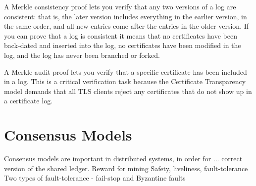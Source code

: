 
A Merkle consistency proof lets you verify that any two versions of a log are consistent: that is, the later version includes everything in the earlier version, in the same order, and all new entries come after the entries in the older version. If you can prove that a log is consistent it means that no certificates have been back-dated and inserted into the log, no certificates have been modified in the log, and the log has never been branched or forked.

A Merkle audit proof lets you verify that a specific certificate has been included in a log. This is a critical verification task because the Certificate Transparency model demands that all TLS clients reject any certificates that do not show up in a certificate log.

\section{Consensus Models}
Consensus models are important in distributed systems, in order for ... correct version of the shared ledger. 
Reward for mining
Safety, liveliness, fault-tolerance
Two types of fault-tolerance - fail-stop and Byzantine faults 



